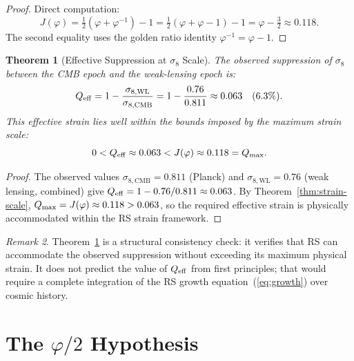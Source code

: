 \documentclass[12pt,a4paper]{article}
\newtheorem{theorem}{Theorem}[section]
\theoremstyle{definition}
\theoremstyle{remark}
\newtheorem{remark}[theorem]{Remark}
\begin{document}
\begin{proof}
Direct computation:
\[
J(\varphi) = \tfrac{1}{2}(\varphi + \varphi^{-1}) - 1
           = \tfrac{1}{2}(\varphi + \varphi - 1) - 1
           = \varphi - \tfrac{3}{2} \approx 0.118.
\]
The second equality uses the golden ratio identity $\varphi^{-1} = \varphi - 1$.
\end{proof}

\begin{theorem}[Effective Suppression at $\sigma_8$ Scale]
\label{thm:suppression}
The observed suppression of $\sigma_8$ between the CMB epoch and the
weak-lensing epoch is:
\begin{equation}
  Q_{\rm eff} = 1 - \frac{\sigma_{8,\mathrm{WL}}}{\sigma_{8,\mathrm{CMB}}}
  = 1 - \frac{0.76}{0.811} \approx 0.063 \quad (6.3\%).
\end{equation}
This effective strain lies well within the bounds imposed by the
maximum strain scale:
\begin{equation}
  0 < Q_{\rm eff} \approx 0.063 < J(\varphi) \approx 0.118 = Q_{\rm max}.
\end{equation}
\end{theorem}

\begin{proof}
The observed values $\sigma_{8,\mathrm{CMB}} = 0.811$ (Planck) and
$\sigma_{8,\mathrm{WL}} = 0.76$ (weak lensing, combined) give
$Q_{\rm eff} = 1 - 0.76/0.811 \approx 0.063$.  By
Theorem~\ref{thm:strain-scale}, $Q_{\rm max} = J(\varphi) \approx
0.118 > 0.063$, so the required effective strain is physically
accommodated within the RS strain framework.
\end{proof}

\begin{remark}
Theorem~\ref{thm:suppression} is a structural consistency check: it
verifies that RS can accommodate the observed suppression without
exceeding its maximum physical strain.  It does not predict the value
of $Q_{\rm eff}$ from first principles; that would require a complete
integration of the RS growth equation~(\ref{eq:growth}) over cosmic
history.
\end{remark}

\section{The $\varphi/2$ Hypothesis}
\label{sec:phi2}
\end{document}
